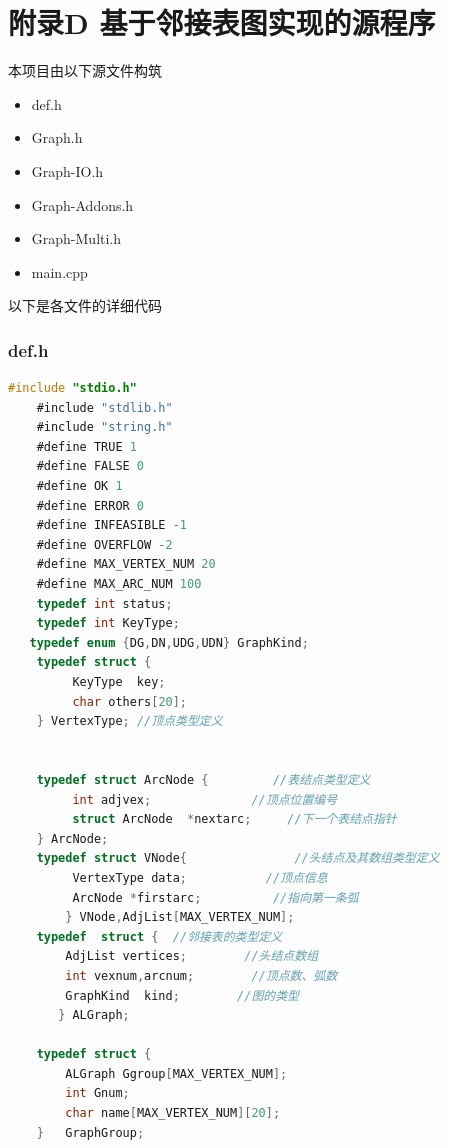 \documentclass[supercite]{Experimental_Report}
\theoremstyle{definition}
\begin{document}
\newpage
\section{附录D 基于邻接表图实现的源程序}

本项目由以下源文件构筑
\begin{itemize}
	\item def.h
	\item Graph.h
	\item Graph-IO.h
	\item Graph-Addons.h
	\item Graph-Multi.h
	\item main.cpp
\end{itemize}

以下是各文件的详细代码

\subsubsection*{def.h}
\begin{lstlisting}[language=C, caption={def.h}, label=lst:def_h_graph]
	#include "stdio.h"
	#include "stdlib.h"
	#include "string.h"
	#define TRUE 1
	#define FALSE 0
	#define OK 1
	#define ERROR 0
	#define INFEASIBLE -1
	#define OVERFLOW -2
	#define MAX_VERTEX_NUM 20
	#define MAX_ARC_NUM 100
	typedef int status;
	typedef int KeyType; 
   typedef enum {DG,DN,UDG,UDN} GraphKind;
	typedef struct {
         KeyType  key;
         char others[20];
	} VertexType; //顶点类型定义


	typedef struct ArcNode {         //表结点类型定义
   		 int adjvex;              //顶点位置编号 
    	 struct ArcNode  *nextarc;	   //下一个表结点指针
	} ArcNode;
	typedef struct VNode{				//头结点及其数组类型定义
   		 VertexType data;       	//顶点信息
    	 ArcNode *firstarc;      	 //指向第一条弧
    	} VNode,AdjList[MAX_VERTEX_NUM];
	typedef  struct {  //邻接表的类型定义
        AdjList vertices;     	 //头结点数组
        int vexnum,arcnum;   	  //顶点数、弧数
        GraphKind  kind;        //图的类型
       } ALGraph;

	typedef struct {
		ALGraph Ggroup[MAX_VERTEX_NUM];
		int Gnum;
		char name[MAX_VERTEX_NUM][20];
	}	GraphGroup;
\end{lstlisting}
\end{document}
